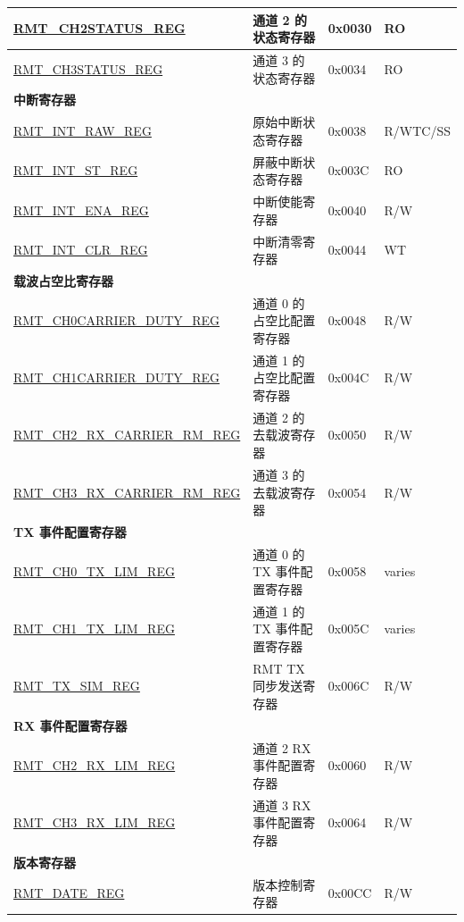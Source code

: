 \begin{longtable}{ | p{5.5cm} | p{6.8cm} | p{1.3cm} | p{1.5cm} | }
\hyperref[regdesc:RMTCHMSTATUSREG]{RMT\_CH2STATUS\_REG} & 通道 2 的状态寄存器 & 0x0030 & RO \\ \hline
\hyperref[regdesc:RMTCHMSTATUSREG]{RMT\_CH3STATUS\_REG} & 通道 3 的状态寄存器 & 0x0034 & RO \\ \hline
\multicolumn{4}{|l|}{\textbf{中断寄存器}} \\ \hline
\hyperref[regdesc:RMTINTRAWREG]{RMT\_INT\_RAW\_REG} & 原始中断状态寄存器 & 0x0038 & R/WTC/SS \\ \hline
\hyperref[regdesc:RMTINTSTREG]{RMT\_INT\_ST\_REG} & 屏蔽中断状态寄存器 & 0x003C & RO \\ \hline
\hyperref[regdesc:RMTINTENAREG]{RMT\_INT\_ENA\_REG} & 中断使能寄存器 & 0x0040 & R/W \\ \hline
\hyperref[regdesc:RMTINTCLRREG]{RMT\_INT\_CLR\_REG} & 中断清零寄存器 & 0x0044 & WT \\ \hline
\multicolumn{4}{|l|}{\textbf{载波占空比寄存器}} \\ \hline
\hyperref[regdesc:RMTCHNCARRIERDUTYREG]{RMT\_CH0CARRIER\_DUTY\_REG} & 通道 0 的占空比配置寄存器 & 0x0048 & R/W \\ \hline
\hyperref[regdesc:RMTCHNCARRIERDUTYREG]{RMT\_CH1CARRIER\_DUTY\_REG} & 通道 1 的占空比配置寄存器 & 0x004C & R/W \\ \hline
\hyperref[regdesc:RMTCHMRXCARRIERRMREG]{RMT\_CH2\_RX\_CARRIER\_RM\_REG} & 通道 2 的去载波寄存器 & 0x0050 & R/W \\ \hline
\hyperref[regdesc:RMTCHMRXCARRIERRMREG]{RMT\_CH3\_RX\_CARRIER\_RM\_REG} & 通道 3 的去载波寄存器 & 0x0054 & R/W \\ \hline
\multicolumn{4}{|l|}{\textbf{TX 事件配置寄存器}} \\ \hline
\hyperref[regdesc:RMTCHNTXLIMREG]{RMT\_CH0\_TX\_LIM\_REG} & 通道 0 的 TX 事件配置寄存器 & 0x0058 & varies \\ \hline
\hyperref[regdesc:RMTCHNTXLIMREG]{RMT\_CH1\_TX\_LIM\_REG} & 通道 1 的 TX 事件配置寄存器 & 0x005C & varies \\ \hline
\hyperref[regdesc:RMTTXSIMREG]{RMT\_TX\_SIM\_REG} & RMT TX 同步发送寄存器 & 0x006C & R/W \\ \hline
\multicolumn{4}{|l|}{\textbf{RX 事件配置寄存器}} \\ \hline
\hyperref[regdesc:RMTCHMRXLIMREG]{RMT\_CH2\_RX\_LIM\_REG} & 通道 2 RX 事件配置寄存器 & 0x0060 & R/W \\ \hline
\hyperref[regdesc:RMTCHMRXLIMREG]{RMT\_CH3\_RX\_LIM\_REG} & 通道 3 RX 事件配置寄存器 & 0x0064 & R/W \\ \hline
\multicolumn{4}{|l|}{\textbf{版本寄存器}} \\ \hline
\hyperref[regdesc:RMTDATEREG]{RMT\_DATE\_REG} & 版本控制寄存器 & 0x00CC & R/W \\ \hline
\end{longtable}
